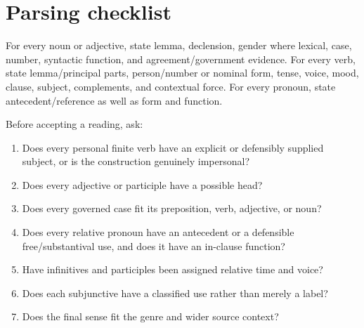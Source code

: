 \RenderCompleteMemoryLexicon

\chapter{Parsing checklist}


For every noun or adjective, state lemma, declension, gender where lexical,
case, number, syntactic function, and agreement/government evidence. For every
verb, state lemma/principal parts, person/number or nominal form, tense, voice,
mood, clause, subject, complements, and contextual force. For every pronoun,
state antecedent/reference as well as form and function.

Before accepting a reading, ask:

\begin{enumerate}
  \item Does every personal finite verb have an explicit or defensibly
        supplied subject, or is the construction genuinely impersonal?
  \item Does every adjective or participle have a possible head?
  \item Does every governed case fit its preposition, verb, adjective, or noun?
  \item Does every relative pronoun have an antecedent or a defensible
        free/substantival use, and does it have an in-clause function?
  \item Have infinitives and participles been assigned relative time and voice?
  \item Does each subjunctive have a classified use rather than merely a label?
  \item Does the final sense fit the genre and wider source context?
\end{enumerate}
